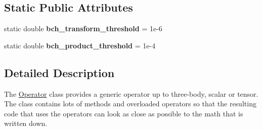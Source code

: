\subsection*{Static Public Attributes}
\begin{DoxyCompactItemize}
\item 
\hypertarget{classOperator_af4743d3c6e99ebf1915b348447c8e688}{static double {\bfseries bch\-\_\-transform\-\_\-threshold} = 1e-\/6}\label{classOperator_af4743d3c6e99ebf1915b348447c8e688}

\item 
\hypertarget{classOperator_ad4a2ba438f3286ef22cc06b61f745993}{static double {\bfseries bch\-\_\-product\-\_\-threshold} = 1e-\/4}\label{classOperator_ad4a2ba438f3286ef22cc06b61f745993}

\end{DoxyCompactItemize}


\subsection{Detailed Description}
The \hyperlink{classOperator}{Operator} class provides a generic operator up to three-\/body, scalar or tensor. The class contains lots of methods and overloaded operators so that the resulting code that uses the operators can look as close as possible to the math that is written down. 

